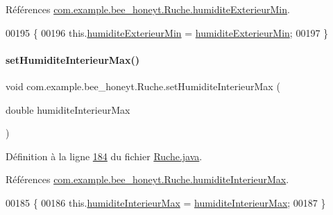 Références \hyperlink{_ruche_8java_source_l00031}{com.\+example.\+bee\+\_\+honeyt.\+Ruche.\+humidite\+Exterieur\+Min}.


\begin{DoxyCode}
00195     \{
00196         this.\hyperlink{classcom_1_1example_1_1bee__honeyt_1_1_ruche_ad58b8815412827add256f6c6e11d3043}{humiditeExterieurMin} = \hyperlink{classcom_1_1example_1_1bee__honeyt_1_1_ruche_ad58b8815412827add256f6c6e11d3043}{humiditeExterieurMin};
00197     \}
\end{DoxyCode}
\mbox{\label{classcom_1_1example_1_1bee__honeyt_1_1_ruche_aa17a8858db45900b9087e0f35bdf2e23}} 
\paragraph{\texorpdfstring{set\+Humidite\+Interieur\+Max()}{setHumiditeInterieurMax()}}
{\footnotesize\ttfamily void com.\+example.\+bee\+\_\+honeyt.\+Ruche.\+set\+Humidite\+Interieur\+Max (\begin{DoxyParamCaption}\item[{double}]{humidite\+Interieur\+Max }\end{DoxyParamCaption})}



Définition à la ligne \hyperlink{_ruche_8java_source_l00184}{184} du fichier \hyperlink{_ruche_8java_source}{Ruche.\+java}.



Références \hyperlink{_ruche_8java_source_l00030}{com.\+example.\+bee\+\_\+honeyt.\+Ruche.\+humidite\+Interieur\+Max}.


\begin{DoxyCode}
00185     \{
00186         this.\hyperlink{classcom_1_1example_1_1bee__honeyt_1_1_ruche_a1483266a1f1ba7d83e0f69bef8e26231}{humiditeInterieurMax} = \hyperlink{classcom_1_1example_1_1bee__honeyt_1_1_ruche_a1483266a1f1ba7d83e0f69bef8e26231}{humiditeInterieurMax};
00187     \}
\end{DoxyCode}
\mbox{\label{classcom_1_1example_1_1bee__honeyt_1_1_ruche_ac06e9c83418f30546fea5d29f250b323}} 
